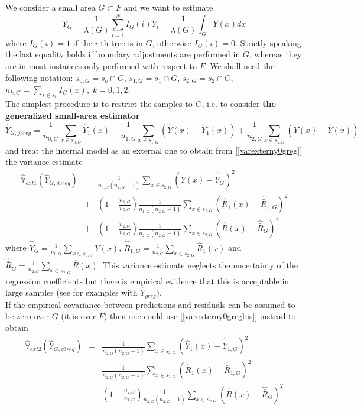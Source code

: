 \documentclass[a4paper,12pt,leqno, titlepage]{article}
\newcommand{\VAR}{\mathbb{V}}
\begin{document}
We consider a small area $G\subset F$ and we want to estimate
$$\bar{Y}_G=\frac{1}{\lambda(G)}\sum_{i=1}^NI_G(i)Y_i=\frac{1}{\lambda(G)}\int_G Y(x)dx$$
where $I_G(i)=1 $ if the $i$-th tree is in $G$, otherwise $I_G(i)=0$. Strictly speaking the last equality holds if boundary adjustments are performed in $G$, whereas they are in most instances only performed with respect to $F$. We shall need the following notation: $s_{0,G}=s_o \cap G$, $s_{1,G}=s_1\cap G$, $s_{2,G}=s_2 \cap G$, $n_{k,G}=\sum_{s\in{s_k}}I_G(x), \;k=0,1,2$. \\
The simplest procedure is to restrict the samples to $G$, i.e. to consider \textbf{the generalized small-area estimator}
\begin{equation}\label{smallareaest1}
\hat{Y}_{G,g3reg}=\frac{1}{n_{0,G}}\sum_{x\in{s_{0,G}}} \hat{Y}_1(x)+
\frac{1}{n_{1,G}}\sum_{x\in{s_{1,G}}}(\hat{Y}(x)-\hat{Y}_1(x))+
\frac{1}{n_{2,G}}\sum_{x\in{s_{2,G}}}(Y(x)-\hat{Y}(x))
\end{equation}
 and treat the internal model as an external one to obtain from [\ref{varexterny0greg}] the variance estimate
 \begin{eqnarray}\label{extsmallareaestvariance1}
 \hat{\VAR}_{ext1}(\hat{Y}_{G,g3reg})&=& \frac{1}{n_{0,G}(n_{2,G}-1)}\sum_{x\in{s_{2,G}}}(Y(x)-\hat{\bar{Y}}_G)^2 \nonumber \\
 &+& (1-\frac{n_{1,G}}{n_{0,G}}){\frac{1}{n_{1,G}(n_{2,G}-1)}\sum_{x\in{s}_{2,G}}}
 (\hat{R}_1(x)-\hat{\bar{R}}_{1,G})^2 \nonumber \\
 &+& (1-\frac{n_{2,G}}{n_{1,G}})\frac{1}{n_{2,G}(n_{2,G}-1)}\sum_{x\in{s_{2,G}}}(\hat{R}(x)-\hat{\bar{R}}_G)^2
 \end{eqnarray}
where $\hat{\bar{Y}}_G=\frac{1}{n_{0,G}}\sum_{x\in{s_{0,G}}}Y(x)$, $\hat{\bar{R}}_{1,G}=\frac{1}{n_{2,G}}\sum_{x\in{s_{2,G}}}\hat{R}_1(x)$ and $\hat{\bar{R}}_G=\frac{1}{n_{2,G}}\sum_{x\in{s_{2,G}}}\hat{R}(x)$. This variance estimate neglects the uncertainty of the regression coefficients but there is empirical evidence that this is acceptable in large samples (see \cite{mandallaz3} for examples with $\hat{Y}_{greg}$).\\
If the empirical covariance between predictions and residuals can be assumed to be zero over $G$ (it is over $F$) then one could use [\ref{varexterny0gregbis}] instead to obtain
\begin{eqnarray}\label{extsmallareaestvariance2}
 \hat{\VAR}_{ext2}(\hat{Y}_{G,g3reg})&=& \frac{1}{n_{0,G}(n_{2,G}-1)}\sum_{x\in{s_{2,G}}}(\hat{Y}_1(x)-\hat{\bar{Y}}_{1,G})^2 \nonumber \\
 &+& {\frac{1}{n_{1,G}(n_{2,G}-1)}\sum_{x\in{s}_{2,G}}}
 (\hat{R}_1(x)-\hat{\bar{R}}_{1,G})^2 \nonumber \\
 &+& (1-\frac{n_{2,G}}{n_{1,G}})\frac{1}{n_{2,G}(n_{2,G}-1)}\sum_{x\in{s_{2,G}}}(\hat{R}(x)-\hat{\bar{R}}_G)^2
 \end{eqnarray}
\end{document}
